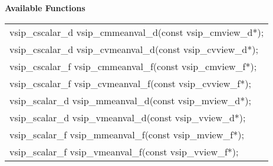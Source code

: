 \\\cvsiplh
\\ \hspace*{.8cm} \vspace*{.1cm} \textbf{Available Functions }
\\ \hspace*{1.1cm} {
\ttfamily
\begin{tabular}[H]{l}
vsip\_cscalar\_d vsip\_cmmeanval\_d(const vsip\_cmview\_d*);\\
vsip\_cscalar\_d vsip\_cvmeanval\_d(const vsip\_cvview\_d*);\\
vsip\_cscalar\_f vsip\_cmmeanval\_f(const vsip\_cmview\_f*);\\
vsip\_cscalar\_f vsip\_cvmeanval\_f(const vsip\_cvview\_f*);\\
vsip\_scalar\_d vsip\_mmeanval\_d(const vsip\_mview\_d*);\\
vsip\_scalar\_d vsip\_vmeanval\_d(const vsip\_vview\_d*);\\
vsip\_scalar\_f vsip\_mmeanval\_f(const vsip\_mview\_f*);\\
vsip\_scalar\_f vsip\_vmeanval\_f(const vsip\_vview\_f*);\\
\end{tabular}
}
\\\pyjvsiph
{}
